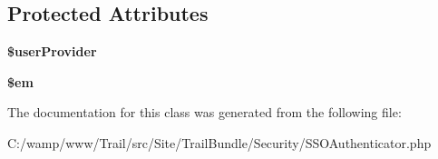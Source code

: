 \subsection*{Protected Attributes}
\begin{DoxyCompactItemize}
\item 
\hypertarget{class_site_1_1_trail_bundle_1_1_security_1_1_s_s_o_authenticator_ad04da789a506dee0ac65495062d2b9ca}{}{\bfseries \$user\+Provider}\label{class_site_1_1_trail_bundle_1_1_security_1_1_s_s_o_authenticator_ad04da789a506dee0ac65495062d2b9ca}

\item 
\hypertarget{class_site_1_1_trail_bundle_1_1_security_1_1_s_s_o_authenticator_a0f2991d5fed029ef50ef619f1a532d06}{}{\bfseries \$em}\label{class_site_1_1_trail_bundle_1_1_security_1_1_s_s_o_authenticator_a0f2991d5fed029ef50ef619f1a532d06}

\end{DoxyCompactItemize}


The documentation for this class was generated from the following file\+:\begin{DoxyCompactItemize}
\item 
C\+:/wamp/www/\+Trail/src/\+Site/\+Trail\+Bundle/\+Security/S\+S\+O\+Authenticator.\+php\end{DoxyCompactItemize}
